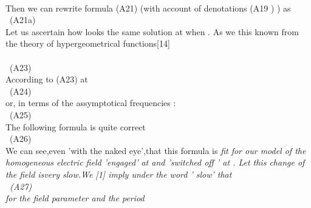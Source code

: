 \documentclass[a4paper,12pt] {article}
\begin{document}
\\ Then we can rewrite formula (A21) (with account of denotations (A19 ) ) as
\\\coordHE{} \ (A21a)
\\ Let us ascertain how looks the same solution at \coordHE{} when \myHighlight{$ \eta \to \infty $}\coordHE{}. As we this
known from the theory of hypergeometrical functions[14]
\\\coordHE{} \\\coordHE{} \ (A23)
\\ According to (A23) at \coordHE{}
\\ \coordHE{} \ (A24)\\ or, in  terms of the assymptotical frequencies :
 \\\coordHE{} \ (A25)\\ The following formula is quite correct
\\\coordHE{} \ (A26)
\\ We can see,even 'with the naked eye',that this formula is \it fit \rm  for our model of the homogeneous
 electric field 'engaged' at \coordHE{} and 'switched off ' at \coordHE{}. Let this change of the field
is\it  very slow.\rm  We [1] imply under the word ' slow' that
\\ \coordHE{} \ (A27)\\ for the field parameter \myHighlight{$\lambda $}\coordHE{} and the period
\end{document}
